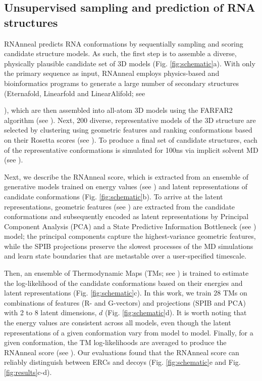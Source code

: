 \documentclass[%
aip,
 amsmath,amssymb,
reprint,%
twocolumn,
]{revtex4-1}
\begin{document}
\subsection*{Unsupervised sampling and prediction of RNA structures}
RNAnneal predicts RNA conformations by sequentially sampling and scoring candidate structure models. As such, the first step is to assemble a diverse, physically plausible candidate set of 3D models (Fig. \ref{fig:schematic}a). With only the primary sequence as input, RNAnneal employs physics-based and bioinformatics programs to generate a large number of secondary structures (Eternafold\cite{wayment2022rna}, Linearfold\cite{huang2019linearfold} and LinearAlifold\cite{malik2024linearalifold}; see {), which are then assembled into all-atom 3D models using the FARFAR2 algorithm (see ).\cite{huang2019linearfold,wayment2022rna,malik2024linearalifold,watkins2020farfar2} Next, 200 diverse, representative models of the 3D structure are selected by clustering using geometric features and ranking conformations based on their Rosetta scores (see  ). To produce a final set of candidate structures, each of the representative conformations is simulated for 100ns via implicit solvent MD (see ). 


Next, we describe the RNAnneal score, which is extracted from an ensemble of generative models trained on energy values (see ) and latent representations of candidate conformations (Fig. \ref{fig:schematic}b). To arrive at the latent representations, geometric features (see ) are extracted from the candidate conformations and subsequently encoded as latent representations by Principal Component Analysis (PCA) and a State Predictive Information Bottleneck\cite{wang2021state} (see ) model; the principal components capture the highest-variance geometric features, while the SPIB projections preserve the slowest processes of the MD simulations and learn state boundaries that are metastable over a user-specified timescale.

Then, an ensemble of Thermodynamic Maps\cite{herron2024inferring} (TMs; see ) is trained to estimate the log-likelihood of the candidate conformations based on their energies and latent representations (Fig. \ref{fig:schematic}c).\cite{herron2024inferring} In this work, we train $28$ TMs on combinations of features (R- and G-vectors) and projections (SPIB and PCA) with 2 to 8 latent dimensions, $d$ (Fig. \ref{fig:schematic}d). It is worth noting that the energy values are consistent across all models, even though the latent representations of a given conformation vary from model to model. Finally, for a given conformation, the TM log-likelihoods are averaged to produce the RNAnneal score (see ). Our evaluations found that the RNAnneal score can reliably distinguish between ERCs and decoys (Fig. \ref{fig:schematic}e and Fig. \ref{fig:results}c-d).

}
\end{document}
